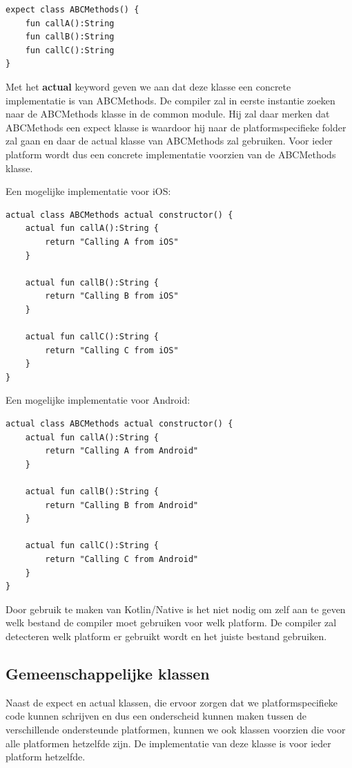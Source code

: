 \begin{lstlisting}
expect class ABCMethods() {
	fun callA():String
	fun callB():String
	fun callC():String
}
\end{lstlisting}

Met het \textbf{actual} keyword geven we aan dat deze klasse een concrete implementatie is van ABCMethods. De compiler zal in eerste instantie zoeken naar de ABCMethods klasse in de common module. Hij zal daar merken dat ABCMethods een expect klasse is waardoor hij naar de platformspecifieke folder zal gaan en daar de actual klasse van ABCMethods zal gebruiken. Voor ieder platform wordt dus een concrete implementatie voorzien van de ABCMethods klasse.

Een mogelijke implementatie voor iOS:
\begin{lstlisting}
actual class ABCMethods actual constructor() {
	actual fun callA():String {
		return "Calling A from iOS"
	}
	
	actual fun callB():String {
		return "Calling B from iOS"
	}
	
	actual fun callC():String {
		return "Calling C from iOS"
	}
}
\end{lstlisting}

Een mogelijke implementatie voor Android:
\begin{lstlisting}
actual class ABCMethods actual constructor() {
	actual fun callA():String {
		return "Calling A from Android"
	}
	
	actual fun callB():String {
		return "Calling B from Android"
	}
	
	actual fun callC():String {
		return "Calling C from Android"
	}
}
\end{lstlisting}

Door gebruik te maken van Kotlin/Native is het niet nodig om zelf aan te geven welk bestand de compiler moet gebruiken voor welk platform. De compiler zal detecteren welk platform er gebruikt wordt en het juiste bestand gebruiken.

\subsection{Gemeenschappelijke klassen}
Naast de expect en actual klassen, die ervoor zorgen dat we platformspecifieke code kunnen schrijven en dus een onderscheid kunnen maken tussen de verschillende ondersteunde platformen, kunnen we ook klassen voorzien die voor alle platformen hetzelfde zijn. De implementatie van deze klasse is voor ieder platform hetzelfde.


